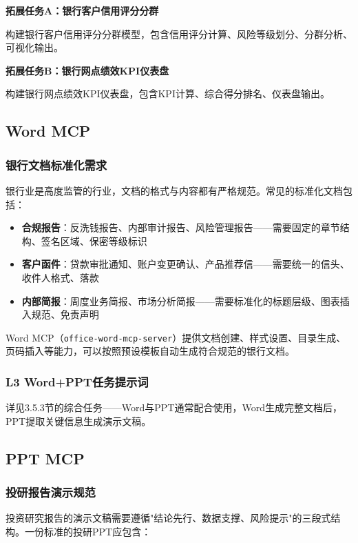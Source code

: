 \textbf{拓展任务A：银行客户信用评分分群}

构建银行客户信用评分分群模型，包含信用评分计算、风险等级划分、分群分析、可视化输出。

\textbf{拓展任务B：银行网点绩效KPI仪表盘}

构建银行网点绩效KPI仪表盘，包含KPI计算、综合得分排名、仪表盘输出。

\subsection{Word MCP}

\subsubsection{银行文档标准化需求}

银行业是高度监管的行业，文档的格式与内容都有严格规范。常见的标准化文档包括：

\begin{itemize}[leftmargin=2em]
  \item \textbf{合规报告}：反洗钱报告、内部审计报告、风险管理报告——需要固定的章节结构、签名区域、保密等级标识
  \item \textbf{客户函件}：贷款审批通知、账户变更确认、产品推荐信——需要统一的信头、收件人格式、落款
  \item \textbf{内部简报}：周度业务简报、市场分析简报——需要标准化的标题层级、图表插入规范、免责声明
\end{itemize}

Word MCP（\texttt{office-word-mcp-server}）提供文档创建、样式设置、目录生成、页码插入等能力，可以按照预设模板自动生成符合规范的银行文档。

\subsubsection{L3 Word+PPT任务提示词}

详见3.5.3节的综合任务——Word与PPT通常配合使用，Word生成完整文档后，PPT提取关键信息生成演示文稿。

\subsection{PPT MCP}

\subsubsection{投研报告演示规范}

投资研究报告的演示文稿需要遵循"结论先行、数据支撑、风险提示"的三段式结构。一份标准的投研PPT应包含：

